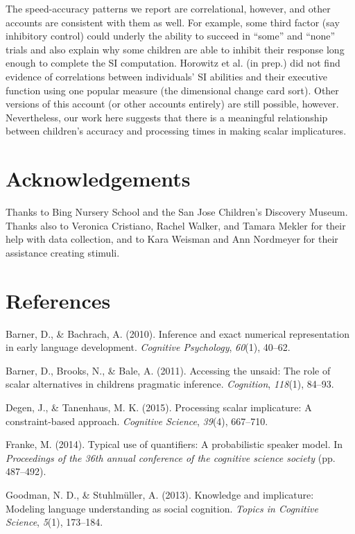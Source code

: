 \documentclass[10pt, letterpaper]{article}
\begin{document}
The speed-accuracy patterns we report are correlational, however, and
other accounts are consistent with them as well. For example, some third
factor (say inhibitory control) could underly the ability to succeed in
``some'' and ``none'' trials and also explain why some children are able
to inhibit their response long enough to complete the SI computation.
Horowitz et al. (in prep.) did not find evidence of correlations between
individuals' SI abilities and their executive function using one popular
measure (the dimensional change card sort). Other versions of this
account (or other accounts entirely) are still possible, however.
Nevertheless, our work here suggests that there is a meaningful
relationship between children's accuracy and processing times in making
scalar implicatures.

\section{Acknowledgements}\label{acknowledgements}

Thanks to Bing Nursery School and the San Jose Children's Discovery
Museum. Thanks also to Veronica Cristiano, Rachel Walker, and Tamara
Mekler for their help with data collection, and to Kara Weisman and Ann
Nordmeyer for their assistance creating stimuli.

\section{References}\label{references}

\setlength{\parindent}{-0.1in} \setlength{\leftskip}{0.125in} \noindent

Barner, D., \& Bachrach, A. (2010). Inference and exact numerical
representation in early language development. \emph{Cognitive
Psychology}, \emph{60}(1), 40--62.

Barner, D., Brooks, N., \& Bale, A. (2011). Accessing the unsaid: The
role of scalar alternatives in childrens pragmatic inference.
\emph{Cognition}, \emph{118}(1), 84--93.

Degen, J., \& Tanenhaus, M. K. (2015). Processing scalar implicature: A
constraint-based approach. \emph{Cognitive Science}, \emph{39}(4),
667--710.

Franke, M. (2014). Typical use of quantifiers: A probabilistic speaker
model. In \emph{Proceedings of the 36th annual conference of the
cognitive science society} (pp. 487--492).

Goodman, N. D., \& Stuhlm{ü}ller, A. (2013). Knowledge and implicature:
Modeling language understanding as social cognition. \emph{Topics in
Cognitive Science}, \emph{5}(1), 173--184.
\end{document}
